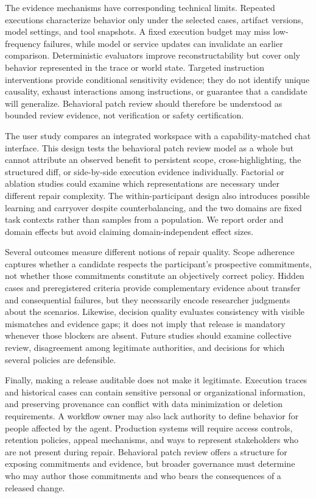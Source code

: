 The evidence mechanisms have corresponding technical limits. Repeated
executions characterize behavior only under the selected cases, artifact
versions, model settings, and tool snapshots. A fixed execution budget may
miss low-frequency failures, while model or service updates can invalidate an
earlier comparison. Deterministic evaluators improve reconstructability but
cover only behavior represented in the trace or world state. Targeted
instruction interventions provide conditional sensitivity evidence; they do
not identify unique causality, exhaust interactions among instructions, or
guarantee that a candidate will generalize. Behavioral patch review should
therefore be understood as bounded review evidence, not verification or safety
certification.

The user study compares an integrated workspace with a capability-matched chat
interface. This design tests the behavioral patch review model as a whole but
cannot attribute an observed benefit to persistent scope, cross-highlighting,
the structured diff, or side-by-side execution evidence individually. Factorial
or ablation studies could examine which representations are necessary under
different repair complexity. The within-participant design also introduces
possible learning and carryover despite counterbalancing, and the two domains
are fixed task contexts rather than samples from a population. We report order
and domain effects but avoid claiming domain-independent effect sizes.

Several outcomes measure different notions of repair quality. Scope adherence
captures whether a candidate respects the participant's prospective
commitments, not whether those commitments constitute an objectively correct
policy. Hidden cases and preregistered criteria provide complementary evidence
about transfer and consequential failures, but they necessarily encode
researcher judgments about the scenarios. Likewise, decision quality evaluates
consistency with visible mismatches and evidence gaps; it does not imply that
release is mandatory whenever those blockers are absent. Future studies should
examine collective review, disagreement among legitimate authorities, and
decisions for which several policies are defensible.

Finally, making a release auditable does not make it legitimate. Execution
traces and historical cases can contain sensitive personal or organizational
information, and preserving provenance can conflict with data minimization or
deletion requirements. A workflow owner may also lack authority to define
behavior for people affected by the agent. Production systems will require
access controls, retention policies, appeal mechanisms, and ways to represent
stakeholders who are not present during repair. Behavioral patch review offers
a structure for exposing commitments and evidence, but broader governance must
determine who may author those commitments and who bears the consequences of a
released change.
